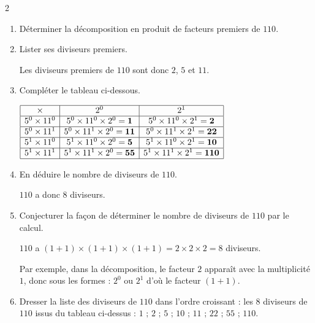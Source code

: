 \begin{corrige}
    \phantom{rrr}
    \begin{multicols}2
        \begin{enumerate}
            \item Déterminer la décomposition en produit de facteurs premiers de $110$.        
            \item Lister ses diviseurs premiers.
            
            Les diviseurs premiers de $110$ sont donc $2$, $5$ et $11$.
            \item Compléter le tableau ci-dessous.
            
            \smallskip
            $\renewcommand{\arraystretch}{1}
            \begin{array}{|c|c|c|}
                \hline
                \times & 2^{0} & 2^{1}\\
                \hline
                5^{0}\times11^{0} & 5^{0}\times11^{0}\times2^{0}=\mathbf{1} & 5^{0}\times11^{0}\times2^{1}=\mathbf{2}\\
                \hline
                5^{0}\times11^{1} & 5^{0}\times11^{1}\times2^{0}=\mathbf{11} & 5^{0}\times11^{1}\times2^{1}=\mathbf{22}\\
                \hline
                5^{1}\times11^{0} & 5^{1}\times11^{0}\times2^{0}=\mathbf{5} & 5^{1}\times11^{0}\times2^{1}=\mathbf{10}\\
                \hline
                5^{1}\times11^{1} & 5^{1}\times11^{1}\times2^{0}=\mathbf{55} & 5^{1}\times11^{1}\times2^{1}=\mathbf{110}\\
                \hline
            \end{array}
            \renewcommand{\arraystretch}{1}$
            \smallskip

            \item En déduire le nombre de diviseurs de $110$.
            
            $110$ a donc $8$ diviseurs.

            \item Conjecturer la façon de déterminer le nombre de diviseurs de $110$ par le calcul.

            $110$ a $(1+1)\times(1+1)\times(1+1) = 2\times2\times2 = 8$ diviseurs.

            Par exemple, dans la décomposition, le facteur $2$ apparaît avec la multiplicité $1$, donc sous les formes : $2^{0}$ ou $2^{1}$ d'où le facteur $(1+1)$.       
            \item Dresser la liste des diviseurs de $110$ dans l'ordre croissant : les $8$ diviseurs de $110$ issus du tableau ci-dessus : $1\text{ ; }2\text{ ; }5\text{ ; }10\text{ ; }11\text{ ; }22\text{ ; }55\text{ ; }110.$
        \end{enumerate}
    \end{multicols}
\end{corrige}

